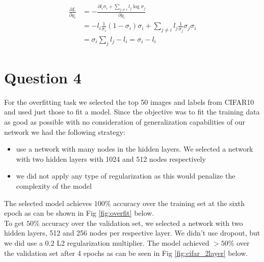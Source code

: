 \documentclass[12pt,twoside]{article}
\begin{document}
\begin{align*}
\frac{\partial L}{\partial y_i} &= -\frac{\partial l_i \sigma_i + \sum_{j \neq i}l_j \log \sigma_j}{\partial y_i}\\
&= - l_i \frac{1}{\sigma_i} (1-\sigma_i) \sigma_i + \sum_{j \neq i} l_j \frac{1}{\sigma_j} \sigma_j \sigma_i \\
&= \sigma_i \sum_j l_j - l_i = \sigma_i - l_i
\end{align*}
\section{Question 4}

For the overfitting task we selected the top 50 images and labels from CIFAR10 and used just those to fit a model. Since the objective was to fit the training data as good as possible with no consideration of generalization capabilities of our network we had the following strategy:
\begin{itemize}
\item use a network with many nodes in the hidden layers. We selected a network with two hidden layers with 1024 and 512 nodes respectively
\item we did not apply any type of regularization as this would penalize the complexity of the model
\end{itemize}

The selected model achieves $100\%$ accuracy over the training set at the sixth epoch as can be shown in Fig \ref{fig:overfit} below.
\\

To get $50\%$ accuracy over the validation set, we selected a network with two hidden layers, 512 and 256 nodes per respective layer. We didn't use dropout, but we did use a $0.2$ L2 regularization multiplier. The model achieved $>50\%$ over the validation set after 4 epochs as can be seen in Fig \ref{fig:cifar_2layer} below. 
\end{document}
